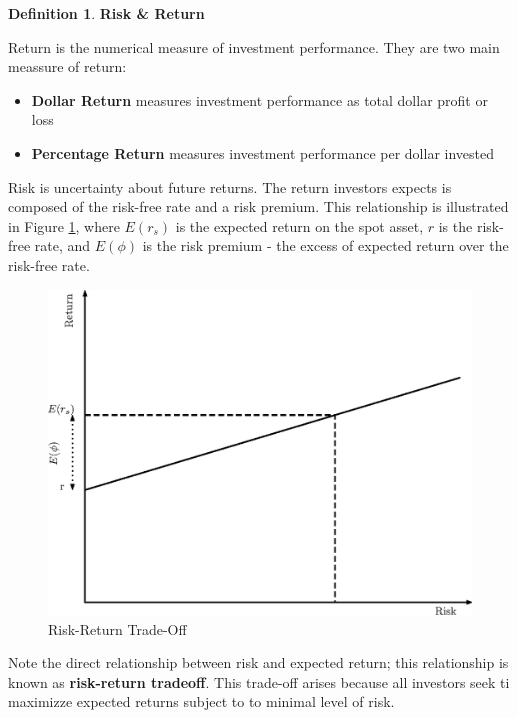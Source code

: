 \documentclass{book}
\theoremstyle{definition}
\newtheorem{definition}{Definition}[section]
\theoremstyle{remark}
\begin{document}
        \begin{definition}{\textbf{Risk \& Return}}
        
            Return is the numerical measure of investment performance. They are two main meassure of return:
                \begin{itemize}
                    \item \textbf{Dollar Return} measures investment performance as total dollar profit or loss
                    
                    \item \textbf{Percentage Return} measures investment performance per dollar invested
                \end{itemize}
            
            Risk is uncertainty about future returns. The return investors expects is composed of the risk-free rate and a risk premium. This relationship is illustrated in Figure \ref{fig:1RiskReturn}, where $E(r_s)$ is the expected return on the spot asset, $r$ is the risk-free rate, and $E(\phi)$ is the risk premium - the excess of expected return over the risk-free rate.
               
                \begin{figure}[h]
                    \centering
                        \includegraphics[scale=0.65]{images/fig:1RiskReturn.eps}
                    \caption{Risk-Return Trade-Off}
                    \label{fig:1RiskReturn}                
                \end{figure}
            
            Note the direct relationship between risk and expected return; this relationship is known as \textbf{risk-return tradeoff}. This trade-off arises because all investors seek ti maximizze expected returns subject to to minimal level of risk. 
            
        \end{definition}
        
\end{document}
